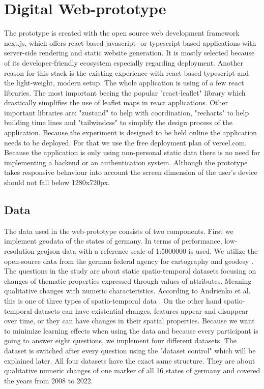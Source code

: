 \chapter{Digital Web-prototype}
The prototype is created with the open source web development framework next.js, which offers react-based javascript- or
typescript-based applications with server-side rendering and static website generation. It is mostly selected because of its
developer-friendly ecosystem especially regarding deployment. Another reason for this stack is the existing experience
with react-based typescript and the light-weight, modern setup. The whole application is using of a few react libraries.
The most important beeing the popular "react-leaflet" library which drastically simplifies the use of leaflet maps in react
applications. Other important libraries are: "zustand" to help with coordination, "recharts" to help building time lines and
"tailwindcss" to simplify the design process of the application. Because the experiment is designed to be held online the
application needs to be deployed. For that we use the free deployment plan of vercel.com. Because the application is only
using non-personal static data there is no need for implementing a backend or an authentication system. Although the prototype
takes responsive behaviour into account the screen dimension of the user's device should not fall below 1280x720px. 
\section{Data}
The data used in the web-prototype consists of two components. First we implement geodata of the states of germany. In terms of
performance, low-resolution geojson data with a reference scale of 1:5000000 is used. We utilize the open-source data
from the german federal agency for cartography and geodesy \citep*{gdz.bkg}. The questions in the study are about static
spatio-temporal datasets focusing on changes of thematic properties expressed through values of attributes. Meaning
qualitative changes with numeric characteristics. According to Andrienko et al. this is one of three types of spatio-temporal
data \citep*{Andrienko.2003}. On the other hand spatio-temporal datasets can have existential changes, features appear and
disappear over time, or they can have changes in their spatial properties. Because we want to minimize learning effects
when using the data and because every participant is going to answer eight questions, we implement four different
datasets. The dataset is switched after every question using the "dataset control" which will be explained later. All four datasets
have the exact same structure. They are about qualitative numeric changes of one marker of all 16 states of germany and covered
the years from 2008 to 2022.
